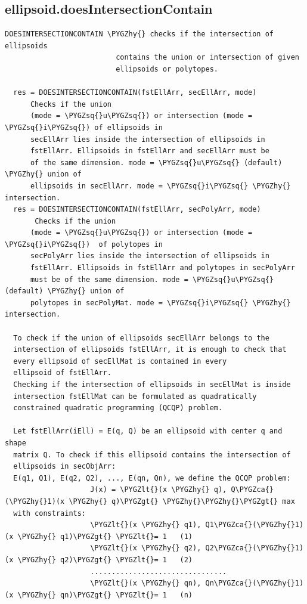 \documentclass[letterpaper,10pt,english]{sphinxmanual}
\def\PYGZca{\char`\^}
\def\PYGZlt{\char`\<}
\def\PYGZgt{\char`\>}
\def\PYGZhy{\char`\-}
\def\PYGZsq{\char`\'}
\begin{document}
\subsection{ellipsoid.doesIntersectionContain}
\label{chap_functions:ellipsoid-doesintersectioncontain}
\begin{Verbatim}[commandchars=\\\{\}]
DOESINTERSECTIONCONTAIN \PYGZhy{} checks if the intersection of ellipsoids
                          contains the union or intersection of given
                          ellipsoids or polytopes.

  res = DOESINTERSECTIONCONTAIN(fstEllArr, secEllArr, mode)
      Checks if the union
      (mode = \PYGZsq{}u\PYGZsq{}) or intersection (mode = \PYGZsq{}i\PYGZsq{}) of ellipsoids in
      secEllArr lies inside the intersection of ellipsoids in
      fstEllArr. Ellipsoids in fstEllArr and secEllArr must be
      of the same dimension. mode = \PYGZsq{}u\PYGZsq{} (default) \PYGZhy{} union of
      ellipsoids in secEllArr. mode = \PYGZsq{}i\PYGZsq{} \PYGZhy{} intersection.
  res = DOESINTERSECTIONCONTAIN(fstEllArr, secPolyArr, mode)
       Checks if the union
      (mode = \PYGZsq{}u\PYGZsq{}) or intersection (mode = \PYGZsq{}i\PYGZsq{})  of polytopes in
      secPolyArr lies inside the intersection of ellipsoids in
      fstEllArr. Ellipsoids in fstEllArr and polytopes in secPolyArr
      must be of the same dimension. mode = \PYGZsq{}u\PYGZsq{} (default) \PYGZhy{} union of
      polytopes in secPolyMat. mode = \PYGZsq{}i\PYGZsq{} \PYGZhy{} intersection.

  To check if the union of ellipsoids secEllArr belongs to the
  intersection of ellipsoids fstEllArr, it is enough to check that
  every ellipsoid of secEllMat is contained in every
  ellipsoid of fstEllArr.
  Checking if the intersection of ellipsoids in secEllMat is inside
  intersection fstEllMat can be formulated as quadratically
  constrained quadratic programming (QCQP) problem.

  Let fstEllArr(iEll) = E(q, Q) be an ellipsoid with center q and shape
  matrix Q. To check if this ellipsoid contains the intersection of
  ellipsoids in secObjArr:
  E(q1, Q1), E(q2, Q2), ..., E(qn, Qn), we define the QCQP problem:
                    J(x) = \PYGZlt{}(x \PYGZhy{} q), Q\PYGZca{}(\PYGZhy{}1)(x \PYGZhy{} q)\PYGZgt{} \PYGZhy{}\PYGZhy{}\PYGZgt{} max
  with constraints:
                    \PYGZlt{}(x \PYGZhy{} q1), Q1\PYGZca{}(\PYGZhy{}1)(x \PYGZhy{} q1)\PYGZgt{} \PYGZlt{}= 1   (1)
                    \PYGZlt{}(x \PYGZhy{} q2), Q2\PYGZca{}(\PYGZhy{}1)(x \PYGZhy{} q2)\PYGZgt{} \PYGZlt{}= 1   (2)
                    ................................
                    \PYGZlt{}(x \PYGZhy{} qn), Qn\PYGZca{}(\PYGZhy{}1)(x \PYGZhy{} qn)\PYGZgt{} \PYGZlt{}= 1   (n)


\end{Verbatim}
\end{document}
